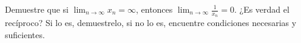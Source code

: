 \documentclass{ayudantia}
\begin{document}
\begin{ans}
    \begin{sol}

    \end{sol}
\end{ans}


\begin{prob}
    Demuestre que si \(\lim_{n\rightarrow\infty}x_n=\infty\), entonces \(\lim_{n\rightarrow\infty}\frac1{x_n}=0\). ¿Es verdad el recíproco? Si lo es, demuestrelo, si no lo es, encuentre condiciones necesarias y suficientes.
\end{prob}

\begin{ans}
    \begin{sol}

    \end{sol}
\end{ans}
\end{document}
